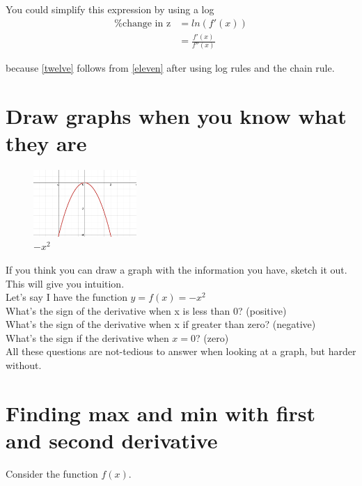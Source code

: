 \documentclass{article}
\begin{document}
You could simplify this expression by using a log 
\begin{align}	
	\text{\% change in z} &= ln(f'(x)) \label{eleven}\\
	&=  \frac{f'(x)}{f''(x)} \label{twelve}
\end{align}

because \ref{twelve} follows from \ref{eleven} after using log rules and the chain rule. 

\section{Draw graphs when you know what they are}

\begin{figure}[htp]
    \centering
        \includegraphics[width=0.35\textwidth]{Screen Shot 2023-10-23 at 4.53.45 PM.png}
    \caption{$-x^2$}
\end{figure}

If you think you can draw a graph with the information you have, sketch it out. This will give you intuition. \\

Let's say I have the function $y = f(x) = -x^2$\\ 

What's the sign of the derivative when x is less than 0? (positive) \\

What's the sign of the derivative when x if greater than zero? (negative) \\

What's the sign if the derivative when $x = 0$? (zero)\\

All these questions are not-tedious to answer when looking at a graph, but harder without. 

\section{Finding max and min with first and second derivative}

Consider the function $f(x)$. \\
\end{document}
